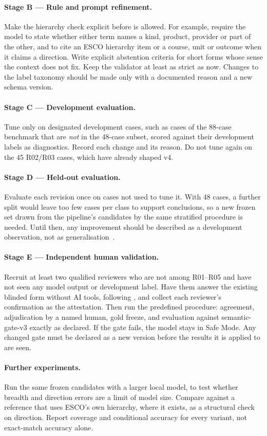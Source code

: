 \paragraph{Stage B --- Rule and prompt refinement.} Make the hierarchy check explicit before \SC{} is allowed. For example, require the model to state whether either term names a kind, product, provider or part of the other, and to cite an ESCO hierarchy item or a course, unit or outcome when it claims a direction. Write explicit abstention criteria for short forms whose sense the context does not fix. Keep the validator at least as strict as now. Changes to the label taxonomy should be made only with a documented reason and a new schema version.

\paragraph{Stage C --- Development evaluation.} Tune only on designated development cases, such as cases of the 88-case benchmark that are \emph{not} in the 48-case subset, scored against their development labels as diagnostics. Record each change and its reason. Do not tune again on the 45 R02/R03 cases, which have already shaped v4.

\paragraph{Stage D --- Held-out evaluation.} Evaluate each revision once on cases not used to tune it. With 48 cases, a further split would leave too few cases per class to support conclusions, so a new frozen set drawn from the pipeline's candidates by the same stratified procedure is needed. Until then, any improvement should be described as a development observation, not as generalisation~\cite{cawley2010}.

\paragraph{Stage E --- Independent human validation.} Recruit at least two qualified reviewers who are not among R01--R05 and have not seen any model output or development label. Have them answer the existing blinded form without AI tools, following , and collect each reviewer's confirmation as the attestation. Then run the predefined procedure: agreement, adjudication by a named human, gold freeze, and evaluation against semantic-gate-v3 exactly as declared. If the gate fails, the model stays in Safe Mode. Any changed gate must be declared as a new version before the results it is applied to are seen.

\paragraph{Further experiments.} Run the same frozen candidates with a larger local model, to test whether breadth and direction errors are a limit of model size. Compare against a reference that uses ESCO's own hierarchy, where it exists, as a structural check on direction. Report coverage and conditional accuracy for every variant, not exact-match accuracy alone.
